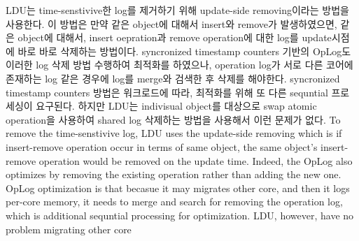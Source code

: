 \ifkor
LDU는 time-senstivive한 log를 제거하기 위해 update-side removing이라는 방법을 사용한다.
이 방법은 만약 같은 object에 대해서 insert와 remove가 발생하였으면, 같은 object에
대해서, insert oepration과 remove operation에 대한 log를 update시점에 바로 바로 삭제하는 방법이다. 
syncronized timestamp counters 기반의 OpLog도 이러한 log 삭제 방법 수행하여 최적화를 하였으나,
operation log가 서로 다른 코어에 존재하는 log 같은 경우에 log를 merge와 검색한 후 삭제를 해야한다. 
syncronized timestamp counters 방법은 워크로드에 따라, 최적화를 위해 또 다른 sequntial 프로세싱이
요구된다.
하지만 LDU는 indivisual object를 대상으로 swap atomic operation을 사용하여
shared log 삭제하는 방법을 사용해서 이런 문제가 없다.
\else
To remove the time-senstivive log, LDU uses the update-side removing which is if
insert-remove operation occur in terms of same object, the same object's
insert-remove operation would be removed on the update time.
Indeed, the OpLog also optimizes by removing the existing operation rather than
adding the new one.
OpLog optimization is that becasue it may migrates other core, and then it logs
per-core memory, it needs to merge and search for removing the operation log,
which is additional sequntial processing for optimization.
LDU, however, have no problem migrating other core
\fi

